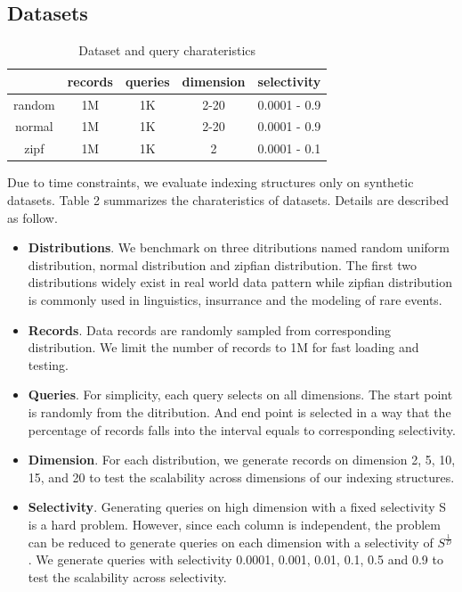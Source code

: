 \documentclass[sigconf,10pt]{acmart}
\begin{document}
\subsection{Datasets}

\begin{table}
  \centering
  \begin{tabular}{|c|c|c|c|c|}
    \hline
          & records & queries & dimension & selectivity \\
    \hline
    random & 1M & 1K & 2-20 & 0.0001 - 0.9 \\
    \hline
    normal & 1M & 1K & 2-20 & 0.0001 - 0.9 \\
    \hline
    zipf & 1M & 1K & 2 & 0.0001 - 0.1 \\
    \hline 
  \end{tabular}
  \caption{Dataset and query charateristics}
  \label{table:dataset}
\end{table}

Due to time constraints, we evaluate indexing structures only on synthetic datasets.
Table 2 summarizes the charateristics of datasets. Details are described as follow.
\begin{itemize}
  \item \textbf{Distributions}. We benchmark on three ditributions named random uniform
  distribution, normal distribution and zipfian distribution. The first two distributions
  widely exist in real world data pattern while zipfian distribution is commonly used in
  linguistics, insurrance and the modeling of rare events.
  \item \textbf{Records}. Data records are randomly sampled from corresponding distribution.
  We limit the number of records to 1M for fast loading and testing.
  \item \textbf{Queries}. For simplicity, each query selects on all dimensions. The start
  point is randomly from the ditribution. And end point is selected in a way that the
  percentage of records falls into the interval equals to corresponding selectivity.
  \item \textbf{Dimension}. For each distribution, we generate records on dimension 2, 5, 10, 15,
  and 20 to test the scalability across dimensions of our indexing structures.
  \item \textbf{Selectivity}. Generating queries on high dimension with a fixed selectivity S is
  a hard problem. However, since each column is independent, the problem can be reduced to generate
  queries on each dimension with a selectivity of $S^{\frac{1}{D}}$. We generate queries with
  selectivity 0.0001, 0.001, 0.01, 0.1, 0.5 and 0.9 to test the scalability across selectivity.
\end{itemize}
\end{document}
